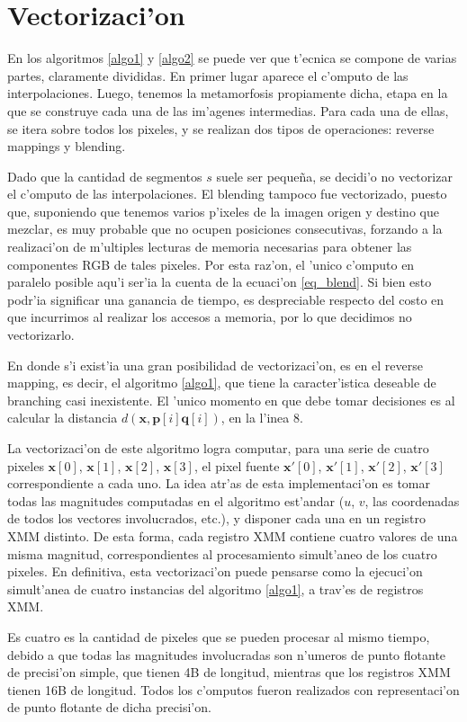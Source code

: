 \section{Vectorizaci'on}

En los algoritmos \ref{algo1} y \ref{algo2} se puede ver que t'ecnica se compone de varias partes, claramente divididas. En primer lugar aparece el c'omputo de las interpolaciones. Luego, tenemos la metamorfosis propiamente dicha, etapa en la que se construye cada una de las im'agenes intermedias. Para cada una de ellas, se itera sobre todos los pixeles, y se realizan dos tipos de operaciones: reverse mappings y blending.

Dado que la cantidad de segmentos $s$ suele ser peque\~{n}a, se decidi'o no vectorizar el c'omputo de las interpolaciones. El blending tampoco fue vectorizado, puesto que, suponiendo que tenemos varios p'ixeles de la imagen origen y destino que mezclar, es muy probable que no ocupen posiciones consecutivas, forzando a la realizaci'on de m'ultiples lecturas de memoria necesarias para obtener las componentes RGB de tales pixeles. Por esta raz'on, el 'unico c'omputo en paralelo posible aqu'i ser'ia la cuenta de la ecuaci'on \ref{eq_blend}. Si bien esto podr'ia significar una ganancia de tiempo, es despreciable respecto del costo en que incurrimos al realizar los accesos a memoria, por lo que decidimos no vectorizarlo.

En donde s'i exist'ia una gran posibilidad de vectorizaci'on, es en el reverse mapping, es decir, el algoritmo \ref{algo1}, que tiene la caracter'istica deseable de branching casi inexistente. El 'unico momento en que debe tomar decisiones es al calcular la distancia $d(\mathbf{x}, \mathbf{p}[i]\mathbf{q}[i])$, en la l'inea 8.

La vectorizaci'on de este algoritmo logra computar, para una serie de cuatro pixeles $\mathbf{x}[0]$, $\mathbf{x}[1]$, $\mathbf{x}[2]$, $\mathbf{x}[3]$, el pixel fuente $\mathbf{x'}[0]$, $\mathbf{x'}[1]$, $\mathbf{x'}[2]$, $\mathbf{x'}[3]$ correspondiente a cada uno. La idea atr'as de esta implementaci'on es tomar todas las magnitudes computadas en el algoritmo est'andar ($u$, $v$, las coordenadas de todos los vectores involucrados, etc.), y disponer cada una en un registro XMM distinto. De esta forma, cada registro XMM contiene cuatro valores de una misma magnitud, correspondientes al procesamiento simult'aneo de los cuatro pixeles. En definitiva, esta vectorizaci'on puede pensarse como la ejecuci'on simult'anea de cuatro instancias del algoritmo \ref{algo1}, a trav'es de registros XMM.

Es cuatro es la cantidad de pixeles que se pueden procesar al mismo tiempo, debido a que todas las magnitudes involucradas son n'umeros de punto flotante de precisi'on simple, que tienen 4B de longitud, mientras que los registros XMM tienen 16B de longitud. Todos los c'omputos fueron realizados con representaci'on de punto flotante de dicha precisi'on.